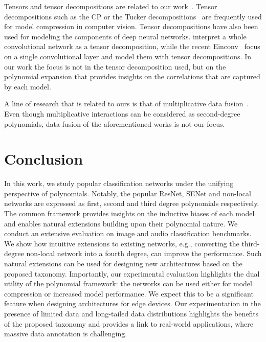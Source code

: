 \documentclass[runningheads]{llncs}
\newcommand{\resnet}{ResNet}
\newcommand{\sne}{SENet}
\providecommand{\citep}{\cite}
\providecommand{\citet}{\cite}
\begin{document}
Tensors and tensor decompositions are related to our work~\citep{Sidiropoulos:16}. 
Tensor decompositions such as the CP or the Tucker decompositions~\citep{kolda2009tensor} are frequently used for model compression in computer vision. Tensor decompositions have also been used for modeling the components of deep neural networks. \citet{cohen2016convolutional} interpret a whole convolutional network as a tensor decomposition, while the recent Einconv~\citep{hayashi2019einconv} focus on a single convolutional layer and model them with tensor decompositions. In our work the focus is not in the tensor decomposition used, but on the polynomial expansion that provides insights on the correlations that are captured by each model. 


A line of research that is related to ours is that of multiplicative data fusion~\cite{jayakumar2020Multiplicative, markos, markos2, chrysos2021conditional, reed2014learning, yu2017multi, kim2018bilinear}. 
Even though multiplicative interactions can be considered as second-degree polynomials, data fusion of the aforementioned works is not our focus.

 \section{Conclusion}

In this work, we study popular classification networks under the unifying perspective of polynomials. Notably, the popular \resnet, \sne{} and non-local networks are expressed as first, second and third degree polynomials respectively. The common framework provides insights on the inductive biases of each model and enables natural extensions building upon their polynomial nature. We conduct an extensive evaluation on image and audio classification benchmarks. 
We show how intuitive extensions to existing networks, e.g., converting the third-degree non-local network into a fourth degree, can improve the performance.
Such natural extensions can be used for designing new architectures based on the proposed taxonomy.  
Importantly, our experimental evaluation highlights the dual utility of the polynomial framework: the networks can be used either for model compression or increased model performance. We expect this to be a significant feature when designing architectures for edge devices. Our experimentation in the presence of limited data and long-tailed data distributions highlights the benefits of the proposed taxonomy and provides a link to real-world applications, where massive data annotation is challenging.  
\end{document}
